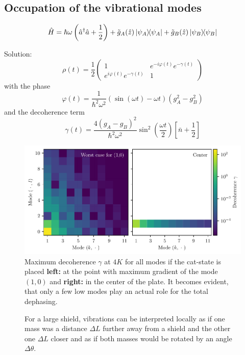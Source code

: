 \subsection{Occupation of the vibrational modes}



\begin{equation}
  \hat{H} = \hbar \omega \left(\hat{a}^\dagger\hat{a} + \frac{1}{2}\right) + \tilde{g}_A(\hat{z}) \ketbra{\psi_A} + \tilde{g}_B(\hat{z}) \ketbra{\psi_B}
\end{equation}

Solution:
\begin{equation}
  \rho(t) = \frac{1}{2}\begin{pmatrix}
    1 & e^{-i\varphi(t)}e^{-\gamma(t)}\\
    e^{i\varphi(t)}e^{-\gamma(t)} & 1
  \end{pmatrix}
\end{equation}
with the phase
\begin{equation}
  \varphi(t) = \frac{1}{\hbar^2\omega^2} \left(\sin(\omega t) - \omega t\right) \left(g_A^2 - g_B^2\right)
\end{equation}
and the decoherence term
\begin{equation}
  \gamma(t) = \frac{4(g_A - g_B)^2}{\hbar^2 \omega^2} \sin^2\left(\frac{\omega t}{2}\right) \left[\bar{n} + \frac{1}{2}\right]
\end{equation}

\begin{figure}[!htbp]
  \centering
  \includegraphics[width=\textwidth]{./../figures/vibrations/decoherence-analytical.pdf}
  \caption{Maximum decoherence $\gamma$ at $4\si{K}$ for all modes if the cat-state is placed \textbf{left:} at the point with maximum gradient of the mode $(1,0)$ and \textbf{right:} in the center of the plate. It becomes evident, that only a few low modes play an actual role for the total dephasing.}
  \label{fig:5:}
\end{figure}


\begin{figure}[!htbp]
  \centering
  \def\svgwidth{\textwidth}
  
  \caption{For a large shield, vibrations can be interpreted locally as if one mass was a distance $\Delta L$ further away from a shield and the other one $\Delta L$ closer and as if both masses would be rotated by an angle $\Delta \theta$.}
\end{figure}